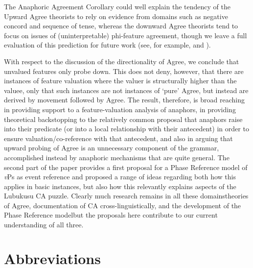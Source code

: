 \documentclass[output=paper
,modfonts
,nonflat
]{langsci/langscibook}
\begin{document}
The Anaphoric Agreement Corollary could well explain the tendency of the Upward Agree theorists to rely on evidence from domains such as negative concord and sequence of tense, whereas the downward Agree theorists tend to focus on issues of (uninterpretable) phi-feature agreement, though we leave a full evaluation of this prediction for future work (see, for example, \citealt{Bjorkman:toappearb} and \citealt{Preminger:2013}). 

With respect to the discussion of the directionality of Agree, we conclude that unvalued features only probe down.  This does not deny, however, that there are instances of feature valuation where the valuer is structurally higher than the valuee, only that such instances are not instances of `pure' Agree, but instead are derived by movement followed by Agree. The result, therefore, is broad reaching in providing support to a feature-valuation analysis of anaphors, in providing theoretical backstopping to the relatively common proposal that anaphors raise into their predicate (or into a local relationship with their antecedent) in order to ensure valuation/co-reference with that antecedent, and also in arguing that upward probing of Agree is an unnecessary component of the grammar, accomplished instead by anaphoric mechanisms that are quite general. The second part of the paper provides a first proposal for a Phase Reference model of \textit{v}Ps as event reference and proposed a range of ideas regarding both how this applies in basic instances, but also how this relevantly explains aspects of the Lubukusu CA puzzle. Clearly much research remains in all these domains\textemdash theories of Agree, documentation of CA cross-linguistically, and the development of the Phase Reference model\textemdash but the proposals here contribute to our current understanding of all three. 

\section*{Abbreviations}
\end{document}
